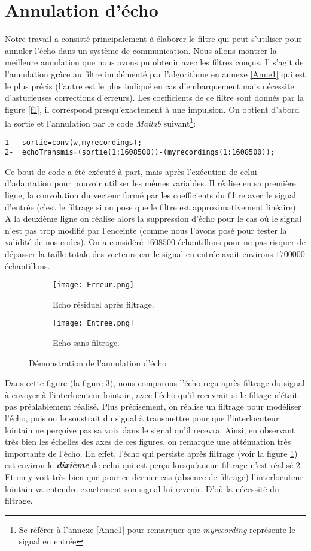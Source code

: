 \section{Annulation d'écho}
Notre travail a consisté principalement à élaborer le filtre qui peut s'utiliser pour annuler l'écho dans un système de communication. Nous allons montrer la meilleure annulation que nous avons pu obtenir avec les filtres conçus. Il s'agit de l'annulation grâce au filtre implémenté par l'algorithme en annexe \ref{Anne1} qui est le plus précis (l'autre est le plus indiqué en cas d'embarquement mais nécessite d'astucieuses corrections d'erreurs). Les coefficients de ce filtre sont donnés par la figure \ref{f1}, il correspond presqu'exactement à une impulsion. On obtient d'abord la sortie et l'annulation par le code \emph{Matlab} suivant\footnote{Se référer à l'annexe \ref{Anne1} pour remarquer que \emph{myrecording} représente le signal en entrée}:
\begin{verbatim}
1-	sortie=conv(w,myrecordings);
2-	echoTransmis=(sortie(1:1608500))-(myrecordings(1:1608500));
\end{verbatim}
Ce bout de code a été exécuté à part, mais après l'exécution de celui d'adaptation pour pouvoir utiliser les mêmes variables. Il réalise en sa première ligne, la convolution du vecteur formé par les coefficients du filtre avec le signal d'entrée (c'est le filtrage si on pose que le filtre est approximativement linéaire). A la deuxième ligne on réalise alors la suppression d'écho pour le cas où le signal n'est pas trop modifié par l'enceinte (comme nous l'avons posé pour tester la validité de nos codes). On a considéré $ 1608500 $ échantillons pour ne pas risquer de dépasser la taille totale des vecteurs car le signal en entrée avait environs $ 1700000 $ échantillons.
\begin{figure}[!h]
\begin{subfigure}{.5 \textwidth}
\centering
\texttt{[image: Erreur.png]}
\caption{Echo résiduel après filtrage.}
\label{echoAnnule}
\end{subfigure}
\begin{subfigure}{.5 \textwidth}
\centering
\texttt{[image: Entree.png]}
\caption{Echo sans filtrage.}
\label{echoNonAnnule}
\end{subfigure}
\caption{Démonstration de l'annulation d'écho}
\label{Annulation}
\end{figure}
Dans cette figure (la figure \ref{Annulation}), nous comparons l'écho reçu après filtrage du signal à envoyer à l'interlocuteur lointain, avec l'écho qu'il recevrait si le filtage n'était pas préalablement réalisé. Plus précisément, on réalise un filtrage pour modéliser l'écho, puis on le soustrait du signal à transmettre pour que l'interlocuteur lointain ne perçoive pas sa voix dans le signal qu'il recevra. Ainsi, en observant très bien les échelles des axes de ces figures, on remarque une atténuation très importante de l'écho. En effet, l'écho qui persiste après filtrage (voir la figure \ref{echoAnnule}) est environ le \emph{\textbf{dixième}} de celui qui est perçu lorsqu'aucun filtrage n'est réalisé \ref{echoNonAnnule}. Et on y voit très bien que pour ce dernier cas (absence de filtrage) l'interlocuteur lointain va entendre exactement son signal lui revenir. D'où la nécessité du filtrage.
